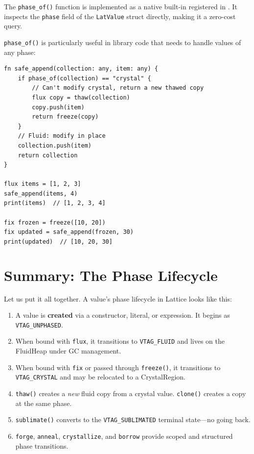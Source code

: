 The \lstinline|phase_of()| function is implemented as a native built-in registered in .
It inspects the \lstinline|phase| field of the \lstinline|LatValue| struct directly, making it a zero-cost query.

\lstinline|phase_of()| is particularly useful in library code that needs to handle values of any phase:

\begin{lstlisting}[language=Lattice, caption={Phase-aware library function}]
fn safe_append(collection: any, item: any) {
    if phase_of(collection) == "crystal" {
        // Can't modify crystal, return a new thawed copy
        flux copy = thaw(collection)
        copy.push(item)
        return freeze(copy)
    }
    // Fluid: modify in place
    collection.push(item)
    return collection
}

flux items = [1, 2, 3]
safe_append(items, 4)
print(items)  // [1, 2, 3, 4]

fix frozen = freeze([10, 20])
fix updated = safe_append(frozen, 30)
print(updated)  // [10, 20, 30]
\end{lstlisting}

\section{Summary: The Phase Lifecycle}\label{sec:phase-lifecycle}

Let us put it all together.
A value's phase lifecycle in Lattice looks like this:

\begin{enumerate}
  \item A value is \textbf{created} via a constructor, literal, or expression. It begins as \lstinline|VTAG_UNPHASED|.
  \item When bound with \lstinline|flux|, it transitions to \lstinline|VTAG_FLUID| and lives on the FluidHeap under GC management.
  \item When bound with \lstinline|fix| or passed through \lstinline|freeze()|, it transitions to \lstinline|VTAG_CRYSTAL| and may be relocated to a CrystalRegion.
  \item \lstinline|thaw()| creates a \emph{new} fluid copy from a crystal value. \lstinline|clone()| creates a copy at the same phase.
  \item \lstinline|sublimate()| converts to the \lstinline|VTAG_SUBLIMATED| terminal state---no going back.
  \item \lstinline|forge|, \lstinline|anneal|, \lstinline|crystallize|, and \lstinline|borrow| provide scoped and structured phase transitions.
\end{enumerate}

